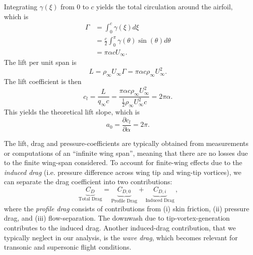 Integrating $\gamma(\xi)$ from $0$ to $c$ yields the total circulation around the airfoil, which is
\begin{align}
	\Gamma &= \int_0^c \gamma(\xi)d\xi \\
		&= \frac{c}{2}\int_0^\pi \gamma(\theta)\sin(\theta)d\theta \\
		&= \pi \alpha c U_\infty.
\end{align}
The lift per unit span is
\begin{equation}
	L = \rho_\infty U_\infty \Gamma = \pi \alpha c \rho_\infty U_\infty^2.
\end{equation}
The lift coefficient is then
\begin{equation}
	c_l = \frac{L}{q_\infty c} = \frac{\pi \alpha c \rho_\infty U_\infty^2}{\frac{1}{2}\rho_\infty U_\infty^2 c} = 2\pi \alpha.
\end{equation}
This yields the theoretical lift slope, which is
\begin{equation}
	a_0 = \frac{\partial c_l}{\partial \alpha} = 2\pi.
\end{equation}

The lift, drag and pressure-coefficients are typically obtained from measurements or computations of an ``infinite wing span'', meaning that there are no losses due to the  finite wing-span considered. To account for finite-wing effects due to the {\it induced drag} (i.e. pressure difference across wing tip and wing-tip vortices), we can separate the drag coefficient into two contributions:
\begin{equation}
  \label{EQ_CD_RELATION}
  \underbrace{C_D}_{\text{Total Drag}} = \underbrace{C_{D,0}}_{\text{Profile Drag}} + \underbrace{C_{D,i}}_{\text{Induced Drag}} \, \text{,}
\end{equation}
where the {\it profile drag} consists of contributions from (i) skin friction, (ii) pressure drag, and (iii) flow-separation. The downwash due to tip-vortex-generation contributes to the induced drag. Another induced-drag contribution, that we typically neglect in our analysis, is the {\it wave drag}, which becomes relevant for transonic and supersonic flight conditions. 
       
